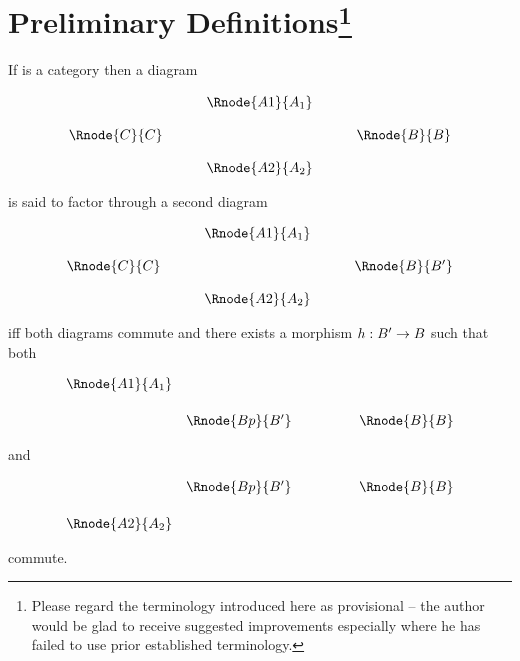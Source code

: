 \documentclass[10pt,a4paper]{article}
\begin{document}
\section{Preliminary Definitions\protect\footnote{Please regard the terminology introduced here as provisional -- the author would be glad to receive suggested improvements especially where he has failed to use prior established terminology.}}
\begin{definition}
\noindent If  is a category  then a diagram 
\begin{center}
\begin{displaymath}
\begin{array}{cp{0.4cm}cp{0.4cm} c}
            & &\Rnode{A1}{A_1}                  \\ [0.4cm]
\Rnode{C}{C}& &                & & \Rnode{B}{B} \\ [0.4cm]
            & &\Rnode{A2}{A_2} 
\end{array}
\end{displaymath}
\end{center}
\noindent is said to factor through a second diagram 
\begin{center}
\begin{displaymath}
\begin{array}{cp{0.4cm}cp{0.4cm} c}
            & &\Rnode{A1}{A_1}                  \\ [0.4cm]
\Rnode{C}{C}& &                & & \Rnode{B}{B'} \\ [0.4cm]
            & &\Rnode{A2}{A_2} 
\end{array}
\end{displaymath}
\end{center}

\noindent iff both diagrams commute and there exists a morphism $h: B' \rightarrow B$ such that 
both

\begin{center}
\begin{displaymath}
\begin{array}{ccp{1cm}c}
\Rnode{A1}{A_1}                               \\ [0.5cm]
               &\Rnode{Bp}{B'}& & \Rnode{B}{B} 
\end{array}
\end{displaymath}
\end{center}

\noindent and

\begin{center}
\begin{displaymath}
\begin{array}{ccp{1cm}c}
               &\Rnode{Bp}{B'}& & \Rnode{B}{B} \\ [0.5cm]
							\Rnode{A2}{A_2}    
\end{array}
\end{displaymath}
\end{center}

\noindent commute. 
\end{definition}
\end{document}
